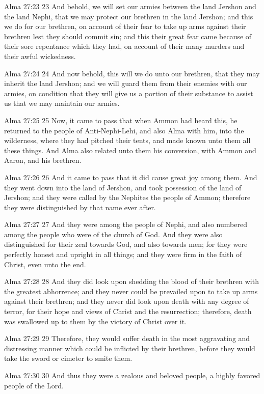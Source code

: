 Alma 27:23
 23 And behold, we will set our armies between the land Jershon
and the land Nephi, that we may protect our brethren in the land
Jershon; and this we do for our brethren, on account of their
fear to take up arms against their brethren lest they should
commit sin; and this their great fear came because of their sore
repentance which they had, on account of their many murders and
their awful wickedness.

Alma 27:24
 24 And now behold, this will we do unto our brethren, that they
may inherit the land Jershon; and we will guard them from their
enemies with our armies, on condition that they will give us a
portion of their substance to assist us that we may maintain our
armies.

Alma 27:25
 25 Now, it came to pass that when Ammon had heard this, he
returned to the people of Anti-Nephi-Lehi, and also Alma with
him, into the wilderness, where they had pitched their tents, and
made known unto them all these things. And Alma also related
unto them his conversion, with Ammon and Aaron, and his brethren.

Alma 27:26
 26 And it came to pass that it did cause great joy among them.
And they went down into the land of Jershon, and took possession
of the land of Jershon; and they were called by the Nephites the
people of Ammon; therefore they were distinguished by that name
ever after.

Alma 27:27
 27 And they were among the people of Nephi, and also numbered
among the people who were of the church of God. And they were
also distinguished for their zeal towards God, and also towards
men; for they were perfectly honest and upright in all things;
and they were firm in the faith of Christ, even unto the end.

Alma 27:28
 28 And they did look upon shedding the blood of their brethren
with the greatest abhorrence; and they never could be prevailed
upon to take up arms against their brethren; and they never did
look upon death with any degree of terror, for their hope and
views of Christ and the resurrection; therefore, death was
swallowed up to them by the victory of Christ over it.

Alma 27:29
 29 Therefore, they would suffer death in the most aggravating
and distressing manner which could be inflicted by their
brethren, before they would take the sword or cimeter to smite
them.

Alma 27:30
 30 And thus they were a zealous and beloved people, a highly
favored people of the Lord.

